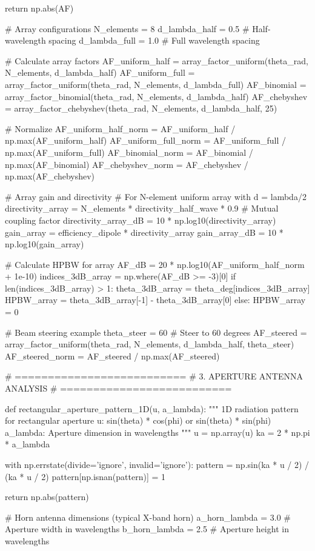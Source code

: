 \documentclass[a4paper, 11pt]{article}
\begin{document}
\begin{pycode}
    return np.abs(AF)

# Array configurations
N_elements = 8
d_lambda_half = 0.5  # Half-wavelength spacing
d_lambda_full = 1.0  # Full wavelength spacing

# Calculate array factors
AF_uniform_half = array_factor_uniform(theta_rad, N_elements, d_lambda_half)
AF_uniform_full = array_factor_uniform(theta_rad, N_elements, d_lambda_full)
AF_binomial = array_factor_binomial(theta_rad, N_elements, d_lambda_half)
AF_chebyshev = array_factor_chebyshev(theta_rad, N_elements, d_lambda_half, 25)

# Normalize
AF_uniform_half_norm = AF_uniform_half / np.max(AF_uniform_half)
AF_uniform_full_norm = AF_uniform_full / np.max(AF_uniform_full)
AF_binomial_norm = AF_binomial / np.max(AF_binomial)
AF_chebyshev_norm = AF_chebyshev / np.max(AF_chebyshev)

# Array gain and directivity
# For N-element uniform array with d = lambda/2
directivity_array = N_elements * directivity_half_wave * 0.9  # Mutual coupling factor
directivity_array_dB = 10 * np.log10(directivity_array)
gain_array = efficiency_dipole * directivity_array
gain_array_dB = 10 * np.log10(gain_array)

# Calculate HPBW for array
AF_dB = 20 * np.log10(AF_uniform_half_norm + 1e-10)
indices_3dB_array = np.where(AF_dB >= -3)[0]
if len(indices_3dB_array) > 1:
    theta_3dB_array = theta_deg[indices_3dB_array]
    HPBW_array = theta_3dB_array[-1] - theta_3dB_array[0]
else:
    HPBW_array = 0

# Beam steering example
theta_steer = 60  # Steer to 60 degrees
AF_steered = array_factor_uniform(theta_rad, N_elements, d_lambda_half, theta_steer)
AF_steered_norm = AF_steered / np.max(AF_steered)

# ==========================
# 3. APERTURE ANTENNA ANALYSIS
# ==========================

def rectangular_aperture_pattern_1D(u, a_lambda):
    """
    1D radiation pattern for rectangular aperture
    u: sin(theta) * cos(phi) or sin(theta) * sin(phi)
    a_lambda: Aperture dimension in wavelengths
    """
    u = np.array(u)
    ka = 2 * np.pi * a_lambda

    with np.errstate(divide='ignore', invalid='ignore'):
        pattern = np.sin(ka * u / 2) / (ka * u / 2)
        pattern[np.isnan(pattern)] = 1

    return np.abs(pattern)

# Horn antenna dimensions (typical X-band horn)
a_horn_lambda = 3.0  # Aperture width in wavelengths
b_horn_lambda = 2.5  # Aperture height in wavelengths


\end{pycode}
\end{document}
